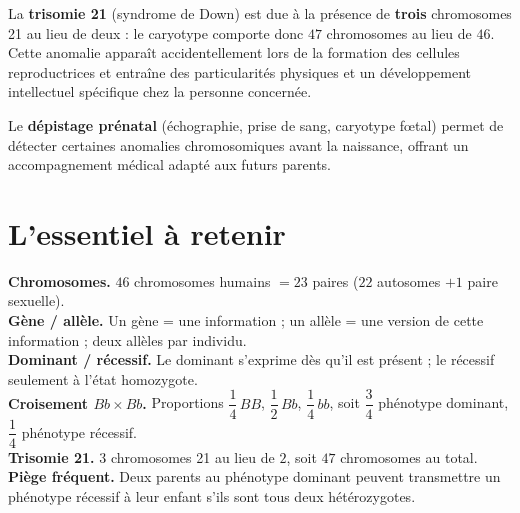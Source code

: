 \begin{propriete}[La trisomie 21]
La \textbf{trisomie 21} (syndrome de Down) est due à la présence de \textbf{trois}
chromosomes 21 au lieu de deux : le caryotype comporte donc $47$ chromosomes au lieu de
$46$. Cette anomalie apparaît accidentellement lors de la formation des cellules
reproductrices et entraîne des particularités physiques et un développement
intellectuel spécifique chez la personne concernée.
\end{propriete}

\begin{illus}
\end{illus}

\begin{remarque}
Le \textbf{dépistage prénatal} (échographie, prise de sang, caryotype fœtal) permet de
détecter certaines anomalies chromosomiques avant la naissance, offrant un accompagnement
médical adapté aux futurs parents.
\end{remarque}

\section{L'essentiel à retenir}

\begin{synthese}
\textbf{Chromosomes.} $46$ chromosomes humains $=23$ paires ($22$ autosomes $+1$ paire
sexuelle).\\[4pt]
\textbf{Gène / allèle.} Un gène = une information ; un allèle = une version de cette
information ; deux allèles par individu.\\[4pt]
\textbf{Dominant / récessif.} Le dominant s'exprime dès qu'il est présent ; le récessif
seulement à l'état homozygote.\\[4pt]
\textbf{Croisement $Bb\times Bb$.} Proportions $\dfrac14\,BB$, $\dfrac12\,Bb$,
$\dfrac14\,bb$, soit $\dfrac34$ phénotype dominant, $\dfrac14$ phénotype récessif.\\[4pt]
\textbf{Trisomie 21.} $3$ chromosomes 21 au lieu de $2$, soit $47$ chromosomes au
total.\\[4pt]
\textbf{Piège fréquent.} Deux parents au phénotype dominant peuvent transmettre un
phénotype récessif à leur enfant s'ils sont tous deux hétérozygotes.
\end{synthese}

